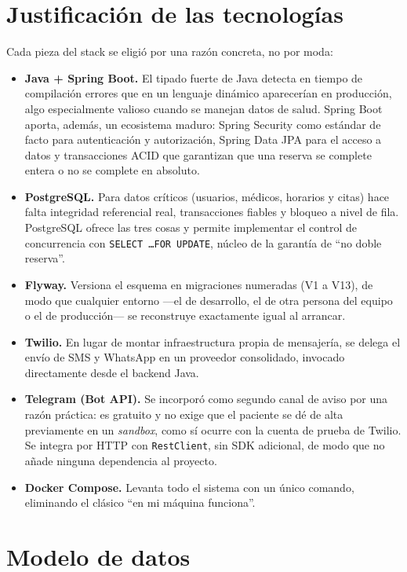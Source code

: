 \documentclass[12pt,a4paper]{report}
\begin{document}
\section{Justificación de las tecnologías}

Cada pieza del stack se eligió por una razón concreta, no por moda:

\begin{itemize}
  \item \textbf{Java + Spring Boot.} El tipado fuerte de Java detecta en tiempo de compilación errores que en un lenguaje dinámico aparecerían en producción, algo especialmente valioso cuando se manejan datos de salud. Spring Boot aporta, además, un ecosistema maduro: Spring Security como estándar de facto para autenticación y autorización, Spring Data JPA para el acceso a datos y transacciones ACID que garantizan que una reserva se complete entera o no se complete en absoluto.
  \item \textbf{PostgreSQL.} Para datos críticos (usuarios, médicos, horarios y citas) hace falta integridad referencial real, transacciones fiables y bloqueo a nivel de fila. PostgreSQL ofrece las tres cosas y permite implementar el control de concurrencia con \texttt{SELECT \ldots FOR UPDATE}, núcleo de la garantía de ``no doble reserva''.
  \item \textbf{Flyway.} Versiona el esquema en migraciones numeradas (V1 a V13), de modo que cualquier entorno —el de desarrollo, el de otra persona del equipo o el de producción— se reconstruye exactamente igual al arrancar.
  \item \textbf{Twilio.} En lugar de montar infraestructura propia de mensajería, se delega el envío de SMS y WhatsApp en un proveedor consolidado, invocado directamente desde el backend Java.
  \item \textbf{Telegram (Bot API).} Se incorporó como segundo canal de aviso por una razón práctica: es gratuito y no exige que el paciente se dé de alta previamente en un \emph{sandbox}, como sí ocurre con la cuenta de prueba de Twilio. Se integra por HTTP con \texttt{RestClient}, sin SDK adicional, de modo que no añade ninguna dependencia al proyecto.
  \item \textbf{Docker Compose.} Levanta todo el sistema con un único comando, eliminando el clásico ``en mi máquina funciona''.
\end{itemize}

\section{Modelo de datos}
\end{document}
